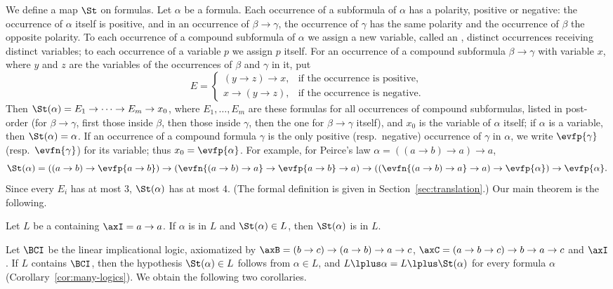 We define a map $\St$ on formulas. Let $\alpha$ be a formula. Each
occurrence of a subformula of $\alpha$ has a polarity, positive or
negative: the
occurrence of $\alpha$ itself is positive, and in an occurrence of
$\beta\to\gamma$, the occurrence of $\gamma$ has the same polarity and the
occurrence of $\beta$ the opposite polarity. To each occurrence of a
compound subformula of $\alpha$ we assign a new variable, called an
, distinct occurrences receiving distinct variables; to each occurrence of a variable
$p$ we assign $p$ itself. For an occurrence of a compound subformula
$\beta\to\gamma$ with variable $x$, where $y$ and $z$ are the variables of
the occurrences of $\beta$ and $\gamma$ in it, put
\[
E=\begin{cases}(y\to z)\to x,&\text{if the occurrence is positive},\\
x\to(y\to z),&\text{if the occurrence is negative}.\end{cases}
\]
Then $\St(\alpha)=E_1\to\dots\to E_m\to x_0$, where $E_1,\dots,E_m$ are
these formulas for all occurrences of compound subformulas, listed in
post-order (for $\beta\to\gamma$, first those inside $\beta$, then those
inside $\gamma$, then the one for $\beta\to\gamma$ itself), and $x_0$ is
the variable of $\alpha$ itself; if $\alpha$ is a variable, then
$\St(\alpha)=\alpha$. If an occurrence of a compound formula $\gamma$ is the
only positive (resp.\ negative) occurrence of $\gamma$ in $\alpha$, we
write $\evfp{\gamma}$ (resp.\ $\evfn{\gamma}$) for its variable; thus
$x_0=\evfp{\alpha}$. For example, for Peirce's law
$\alpha=((a\to b)\to a)\to a$,
\[
\St(\alpha)=((a\to b)\to\evfp{a\to b})\to(\evfn{(a\to b)\to a}\to\evfp{a\to b}\to a)
\to((\evfn{(a\to b)\to a}\to a)\to\evfp{\alpha})\to\evfp{\alpha} .
\]
Since every $E_i$ has  at most $3$, $\St(\alpha)$ has 
at most $4$. (The formal definition is given in Section~\ref{sec:translation}.)
Our main theorem is the following.

\begin{theorem}\label{thm:main}
Let $L$ be a  containing $\axI=a\to a$. If $\alpha$ is
 in $L$ and $\St(\alpha)\in L$, then $\St(\alpha)$ is
 in $L$.
\end{theorem}

Let $\BCI$ be the linear implicational logic, axiomatized by
$\axB=(b\to c)\to(a\to b)\to a\to c$, $\axC=(a\to b\to c)\to b\to a\to c$
and $\axI$. If $L$ contains $\BCI$, then the hypothesis $\St(\alpha)\in L$
follows from $\alpha\in L$, and $L\lplus\alpha=L\lplus\St(\alpha)$ for every
formula $\alpha$ (Corollary~\ref{cor:many-logics}). We obtain the following
two corollaries.

